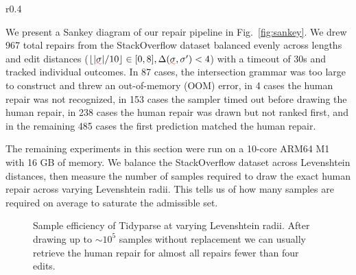 \documentclass[sigplan,review,acmsmall,nonacm,anonymous]{acmart}\settopmatter{printfolios=false,printccs=false,printacmref=false}
\begin{document}
  \begin{wrapfigure}{r}{0.4\textwidth}
    \vspace{-1.5cm}
    \hspace{-0.8cm}
    \resizebox{.53\textwidth}{!}{}
    \vspace{-1.8cm}
    \caption{Outcomes in the repair pipeline.}
    \label{fig:sankey}
  \end{wrapfigure}


  We present a Sankey diagram of our repair pipeline in Fig.~\ref{fig:sankey}. We drew 967 total repairs from the StackOverflow dataset balanced evenly across lengths and edit distances ($\lfloor|\err\sigma| / 10\rfloor \in [0, 8], \Delta(\err\sigma, \sigma') < 4$) with a timeout of 30s and tracked individual outcomes. In 87 cases, the intersection grammar was too large to construct and threw an out-of-memory (OOM) error, in 4 cases the human repair was not recognized, in 153 cases the sampler timed out before drawing the human repair, in 238 cases the human repair was drawn but not ranked first, and in the remaining 485 cases the first prediction matched the human repair.

  \clearpage The remaining experiments in this section were run on a 10-core ARM64 M1 with 16 GB of memory. We balance the StackOverflow dataset across Levenshtein distances, then measure the number of samples required to draw the exact human repair across varying Levenshtein radii. This tells us of how many samples are required on average to saturate the admissible set.

  \begin{figure}[h!]
    
    \caption{Sample efficiency of Tidyparse at varying Levenshtein radii. After drawing up to $\sim10^5$ samples without replacement we can usually retrieve the human repair for almost all repairs fewer than four edits.}\label{fig:sample_efficiency}
  \end{figure}

\end{document}
